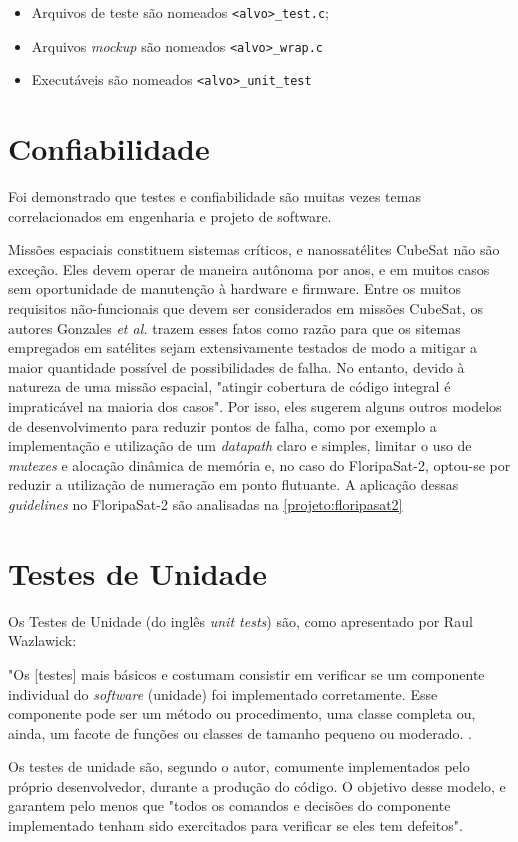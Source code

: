 \begin{itemize}
    \item[] Arquivos de teste são nomeados \texttt{<alvo>\_test.c};
    \item[] Arquivos \textit{mockup} \footnotemark[\value{footnote}] são nomeados \texttt{<alvo>\_wrap.c}
    \item[] Executáveis são nomeados \texttt{<alvo>\_unit\_test}
\end{itemize}



\section{Confiabilidade}
\label{proposta:confiabilidade}
Foi demonstrado que testes e confiabilidade são muitas vezes temas correlacionados em engenharia e projeto de software\cite{malaiya-2002}.

Missões espaciais constituem sistemas críticos, e nanossatélites CubeSat não são exceção. Eles devem operar de maneira autônoma por anos, e em muitos casos sem oportunidade de manutenção à hardware e firmware. Entre os muitos requisitos não-funcionais que devem ser considerados em missões CubeSat, os autores Gonzales \textit{et al.} trazem esses fatos como razão para que os sitemas empregados em satélites sejam extensivamente testados de modo a mitigar a maior quantidade possível de possibilidades de falha. No entanto, devido à natureza de uma missão espacial, "atingir cobertura de código integral é impraticável na maioria dos casos"\cite{gonzales-2019}. Por isso, eles sugerem alguns outros modelos de desenvolvimento para reduzir pontos de falha, como por exemplo a implementação e utilização de um \textit{datapath} claro e simples, limitar o uso de \textit{mutexes} e alocação dinâmica de memória e, no caso do FloripaSat-2, optou-se por reduzir a utilização de numeração em ponto flutuante. A aplicação dessas \textit{guidelines} no FloripaSat-2 são analisadas na \autoref{projeto:floripasat2}

\section{Testes de Unidade}
\label{proposta:testes}
Os Testes de Unidade (do inglês \textit{unit tests}) são, como apresentado por Raul Wazlawick:
\begin{citacao}
\hspace{1,2cm}
"Os [testes] mais básicos e costumam consistir em verificar se um componente individual do \textit{software} (unidade) foi implementado corretamente. Esse componente pode ser um método ou procedimento, uma classe completa ou, ainda, um facote de funções ou classes de tamanho pequeno ou moderado. \cite{engenharia-software}.
\end{citacao}
Os testes de unidade são, segundo o autor, comumente implementados pelo próprio desenvolvedor, durante a produção do código. O objetivo desse modelo, e garantem pelo menos que "todos os comandos e decisões do componente implementado tenham sido exercitados para verificar se eles tem defeitos".

